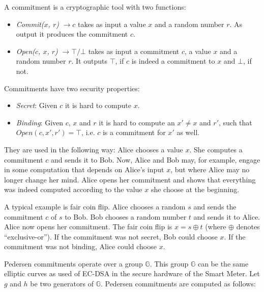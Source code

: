 \documentclass[english]{llncs}
\begin{document}
A commitment is a cryptographic tool with two functions:

\begin{itemize}

\item {\em Commit($x$, $r$)} $\longrightarrow c$ takes as input a value $x$ and a random number $r$.
As output it produces the commitment $c$.

\item {\em Open($c$, $x$, $r$)} $\longrightarrow \top/\bot$ takes as input a commitment $c$, a value $x$ and a random number $r$.
It outputs $\top$, if $c$ is indeed a commitment to $x$ and $\bot$, if not.

\end{itemize}

Commitments have two security properties:

\begin{itemize}

\item {\em Secret}: Given $c$ it is hard to compute $x$.

\item {\em Binding}: Given $c$, $x$ and $r$ it is hard to compute an $x' \neq x$ and $r'$, such that $Open(c, x', r') = \top$, i.e. $c$ is a commitment for $x'$ as well.

\end{itemize}

They are used in the following way:
Alice chooses a value $x$.
She computes a commitment $c$ and sends it to Bob.
Now, Alice and Bob may, for example, engage in some computation that depends on Alice's input $x$, but where Alice may no longer change her mind.
Alice opens her commitment and shows that everything was indeed computed according to the value $x$ she choose at the beginning.

A typical example is fair coin flip.
Alice chooses a random $s$ and sends the commitment $c$ of $s$ to Bob.
Bob chooses a random number $t$ and sends it to Alice.
Alice now opens her commitment.
The fair coin flip is $x = s \oplus t$ (where $\oplus$ denotes ``exclusive-or'').
If the commitment was not secret, Bob could choose $x$.
If the commitment was not binding, Alice could choose $x$.

Pedersen commitments operate over a group $\mathbb{G}$.
This group $\mathbb{G}$ can be the same elliptic curves as used of EC-DSA in the secure hardware of the Smart Meter.
Let $g$ and $h$ be two generators of $\mathbb{G}$.
Pedersen commitments are computed as follows:
\end{document}
